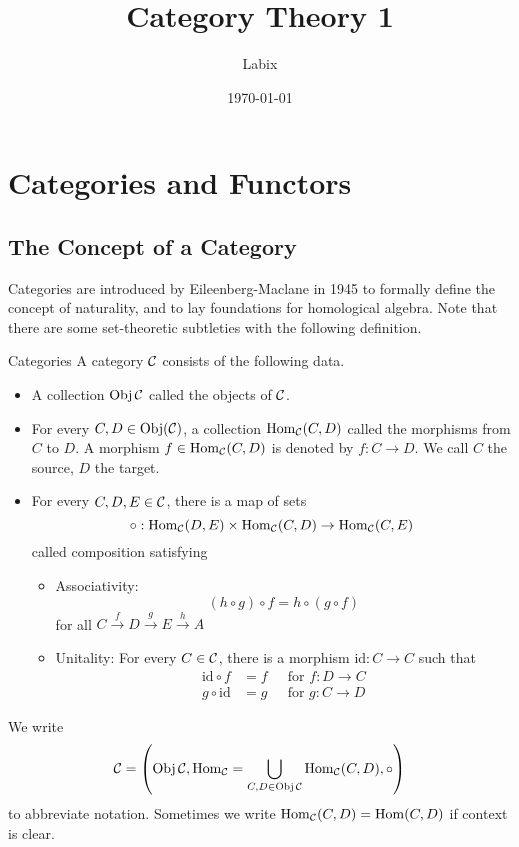 \documentclass[a4paper]{article}
\title{Category Theory 1}
\author{Labix}
\date{\today}
\begin{document}
\maketitle
\begin{abstract}
\end{abstract}
\pagebreak
\tableofcontents
\pagebreak

\section{Categories and Functors}
\subsection{The Concept of a Category}
Categories are introduced by Eileenberg-Maclane in 1945 to formally define the concept of naturality, and to lay foundations for homological algebra. Note that there are some set-theoretic subtleties with the following definition. 

\begin{defn}{Categories}{} A category $\mathcal{C}$ consists of the following data. 
\begin{itemize}
\item A collection $\operatorname{Obj}\mathcal{C}$ called the objects of $\mathcal{C}$. 
\item For every $C,D\in\operatorname{Obj}(\mathcal{C})$, a collection $\operatorname{Hom}_{\mathcal{C}}(C,D)$ called the morphisms from $C$ to $D$. A morphism $f\in\operatorname{Hom}_{\mathcal{C}}(C,D)$ is denoted by $f:C\to D$. We call $C$ the source, $D$ the target. 
\item For every $C,D,E\in\mathcal{C}$, there is a map of sets $$\circ:\operatorname{Hom}_{\mathcal{C}}(D,E)\times\operatorname{Hom}_{\mathcal{C}}(C,D)\to\operatorname{Hom}_{\mathcal{C}}(C,E)$$ called composition satisfying
\begin{itemize}
\item Associativity: $$(h\circ g)\circ f=h\circ(g\circ f)$$ for all $C\overset{f}{\rightarrow}D\overset{g}{\rightarrow}E\overset{h}{\rightarrow}A$
\item Unitality: For every $C\in\mathcal{C}$, there is a morphism $\text{id}:C\to C$ such that 
\begin{align*}
\text{id}\circ f&=f\;\;\;\;\text{ for }f:D\to C\\
g\circ\text{id}&=g\;\;\;\;\text{ for }g:C\to D
\end{align*}
\end{itemize}
\end{itemize}
\end{defn}

We write $$\mathcal{C}=\left(\operatorname{Obj}\mathcal{C},\operatorname{Hom}_{\mathcal{C}}=\bigcup_{C,D\in\operatorname{Obj}\mathcal{C}}\operatorname{Hom}_{\mathcal{C}}(C,D),\circ\right)$$ to abbreviate notation. Sometimes we write $\operatorname{Hom}_{\mathcal{C}}(C,D)=\operatorname{Hom}(C,D)$ if context is clear. 
\end{document}
